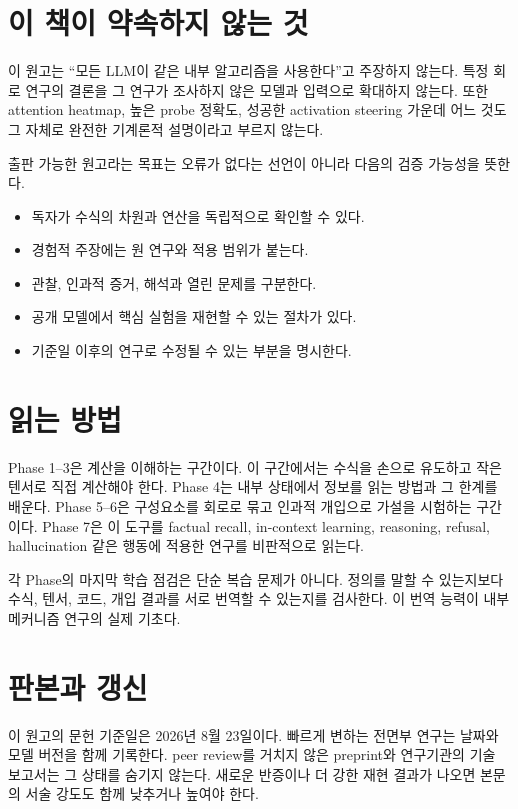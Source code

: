 \section*{이 책이 약속하지 않는 것}

이 원고는 ``모든 LLM이 같은 내부 알고리즘을 사용한다''고 주장하지 않는다.
특정 회로 연구의 결론을 그 연구가 조사하지 않은 모델과 입력으로 확대하지 않는다.
또한 attention heatmap, 높은 probe 정확도, 성공한 activation steering 가운데 어느 것도 그 자체로 완전한 기계론적 설명이라고 부르지 않는다.

출판 가능한 원고라는 목표는 오류가 없다는 선언이 아니라 다음의 검증 가능성을 뜻한다.

\begin{itemize}
  \item 독자가 수식의 차원과 연산을 독립적으로 확인할 수 있다.
  \item 경험적 주장에는 원 연구와 적용 범위가 붙는다.
  \item 관찰, 인과적 증거, 해석과 열린 문제를 구분한다.
  \item 공개 모델에서 핵심 실험을 재현할 수 있는 절차가 있다.
  \item 기준일 이후의 연구로 수정될 수 있는 부분을 명시한다.
\end{itemize}

\section*{읽는 방법}

Phase 1--3은 계산을 이해하는 구간이다.
이 구간에서는 수식을 손으로 유도하고 작은 텐서로 직접 계산해야 한다.
Phase 4는 내부 상태에서 정보를 읽는 방법과 그 한계를 배운다.
Phase 5--6은 구성요소를 회로로 묶고 인과적 개입으로 가설을 시험하는 구간이다.
Phase 7은 이 도구를 factual recall, in-context learning, reasoning, refusal, hallucination 같은 행동에 적용한 연구를 비판적으로 읽는다.

각 Phase의 마지막 학습 점검은 단순 복습 문제가 아니다.
정의를 말할 수 있는지보다 수식, 텐서, 코드, 개입 결과를 서로 번역할 수 있는지를 검사한다.
이 번역 능력이 내부 메커니즘 연구의 실제 기초다.

\section*{판본과 갱신}

이 원고의 문헌 기준일은 2026년 8월 23일이다.
빠르게 변하는 전면부 연구는 날짜와 모델 버전을 함께 기록한다.
peer review를 거치지 않은 preprint와 연구기관의 기술 보고서는 그 상태를 숨기지 않는다.
새로운 반증이나 더 강한 재현 결과가 나오면 본문의 서술 강도도 함께 낮추거나 높여야 한다.
